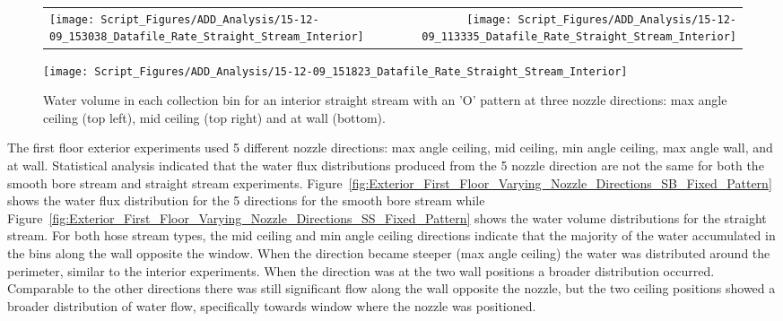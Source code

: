 \documentclass[12pt,oneside]{book}
\begin{document}
\begin{figure}[ht]
\begin{tabular*}{\textwidth}{lr}
\texttt{[image: Script\_Figures/ADD\_Analysis/15-12-09\_153038\_Datafile\_Rate\_Straight\_Stream\_Interior]} &
\texttt{[image: Script\_Figures/ADD\_Analysis/15-12-09\_113335\_Datafile\_Rate\_Straight\_Stream\_Interior]} \\
\end{tabular*}
\centering
\texttt{[image: Script\_Figures/ADD\_Analysis/15-12-09\_151823\_Datafile\_Rate\_Straight\_Stream\_Interior]}
\caption[Water Flux for Varying Nozzle Direction with `O' Interior Straight Stream]{Water volume in each collection bin for an interior straight stream with an 'O' pattern at three nozzle directions: max angle ceiling (top left), mid ceiling (top right) and at wall (bottom).}
\label{fig:Interior_Varying_Nozzle_Direction_SS_O_Pattern}
\end{figure}

\clearpage

The first floor exterior experiments used 5 different nozzle directions: max angle ceiling, mid ceiling, min angle ceiling, max angle wall, and at wall. Statistical analysis indicated that the water flux distributions produced from the 5 nozzle direction are not the same for both the smooth bore stream and straight stream experiments. Figure~\ref{fig:Exterior_First_Floor_Varying_Nozzle_Directions_SB_Fixed_Pattern} shows the water flux distribution for the 5 directions for the smooth bore stream while Figure~\ref{fig:Exterior_First_Floor_Varying_Nozzle_Directions_SS_Fixed_Pattern} shows the water volume distributions for the straight stream. For both hose stream types, the mid ceiling and min angle ceiling directions indicate that the majority of the water accumulated in the bins along the wall opposite the window. When the direction became steeper (max angle ceiling) the water was distributed around the perimeter, similar to the interior experiments. When the direction was at the two wall positions a broader distribution occurred. Comparable to the other directions there was still significant flow along the wall opposite the nozzle, but the two ceiling positions showed a broader distribution of water flow, specifically towards window where the nozzle was positioned.
\end{document}
